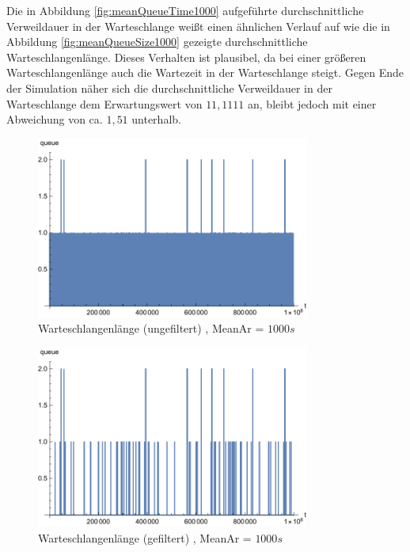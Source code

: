 Die in Abbildung \ref{fig:meanQueueTime1000} aufgeführte durchschnittliche Verweildauer in der Warteschlange weißt einen ähnlichen Verlauf auf wie die in Abbildung \ref{fig:meanQueueSize1000} gezeigte durchschnittliche Warteschlangenlänge. Dieses Verhalten ist plausibel, da bei einer größeren Warteschlangenlänge auch die Wartezeit in der Warteschlange steigt. Gegen Ende der Simulation näher sich die durchschnittliche Verweildauer in der Warteschlange dem Erwartungswert von $11,1111$ an, bleibt jedoch mit einer Abweichung von ca. $1,51$ unterhalb.

\begin{figure}[htpb]
	\centering
	\includegraphics[width=0.8\textwidth]{abbildungen/1_Phone/Arrival_1000_Serve_100_dur_1000000_Skip_0/QueueStepPlotAll.pdf}
	\caption{Warteschlangenlänge (ungefiltert) , MeanAr = $1000s$}
	\label{fig:QueueStepPlotAll1000}
\end{figure}
\begin{figure}[htpb]
	\centering
	\includegraphics[width=0.8\textwidth]{abbildungen/1_Phone/Arrival_1000_Serve_100_dur_1000000_Skip_0/QueueStepPlotAllFiltered.pdf}
	\caption{Warteschlangenlänge (gefiltert) , MeanAr = $1000s$}
	\label{fig:QueueStepPlotAllFiltered1000}
\end{figure}

